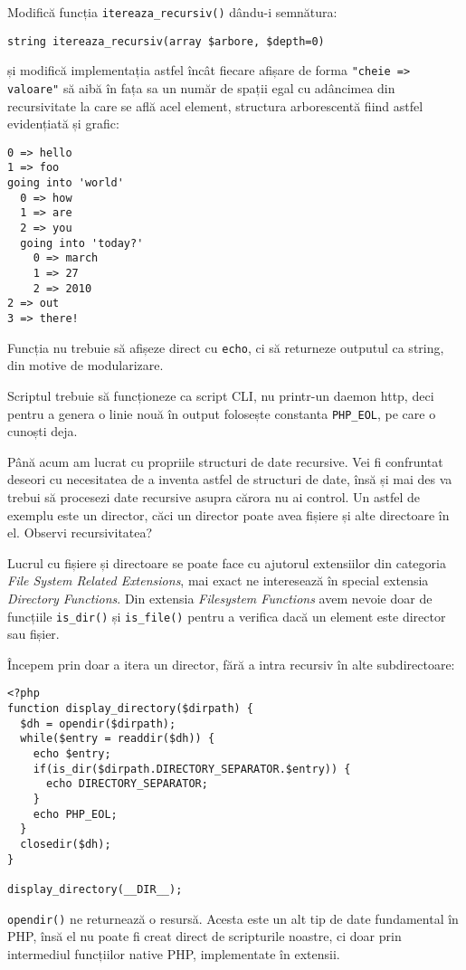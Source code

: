 \begin{Exercise}[title={Adâncimea recursivității},difficulty=2]
Modifică funcția \texttt{itereaza\_recursiv()} dându-i semnătura:
\begin{verbatim}
string itereaza_recursiv(array $arbore, $depth=0)
\end{verbatim}
și modifică implementația astfel încât fiecare afișare
de forma \texttt{"cheie => valoare"} să aibă în fața sa
un număr de spații egal cu adâncimea din recursivitate la care
se află acel element, structura arborescentă fiind
astfel evidențiată și grafic:
\begin{verbatim}
0 => hello
1 => foo
going into 'world'
  0 => how
  1 => are
  2 => you
  going into 'today?'
    0 => march
    1 => 27
    2 => 2010
2 => out
3 => there!
\end{verbatim}
Funcția nu trebuie să afișeze direct cu \texttt{echo},
ci să returneze outputul ca string, din motive
de modularizare.

Scriptul trebuie să funcționeze ca script CLI,
nu printr-un daemon http, deci pentru a genera
o linie nouă în output folosește constanta
\texttt{PHP\_EOL}, pe care o cunoști deja.
\end{Exercise}

Până acum am lucrat cu propriile structuri de date
recursive. Vei fi confruntat deseori cu necesitatea
de a inventa astfel de structuri de date, însă
și mai des va trebui să procesezi date recursive
asupra cărora nu ai control. Un astfel
de exemplu este un director, căci un director poate avea
fișiere și alte directoare în el. Observi recursivitatea?

Lucrul cu fișiere și directoare se poate face
cu ajutorul extensiilor din categoria
\textit{File System Related Extensions}, mai exact
ne interesează în special extensia \textit{Directory Functions}.
Din extensia \textit{Filesystem Functions} avem nevoie
doar de funcțiile \texttt{is\_dir()} și \texttt{is\_file()}
pentru a verifica dacă un element este director sau
fișier.

Începem prin doar a itera un director, fără
a intra recursiv în alte subdirectoare:

\begin{lstlisting}
<?php
function display_directory($dirpath) {
  $dh = opendir($dirpath);
  while($entry = readdir($dh)) {
	echo $entry;
	if(is_dir($dirpath.DIRECTORY_SEPARATOR.$entry)) {
	  echo DIRECTORY_SEPARATOR;
	}
	echo PHP_EOL;
  }
  closedir($dh);
}

display_directory(__DIR__);
\end{lstlisting}
\texttt{opendir()} ne returnează o resursă. Acesta este
un alt tip de date fundamental în PHP, însă
el nu poate fi creat direct de scripturile noastre,
ci doar prin intermediul funcțiilor native PHP,
implementate în extensii.

